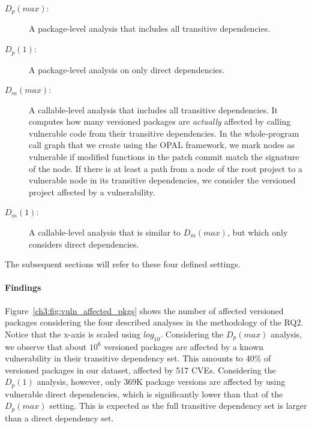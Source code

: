 \begin{description}
%
\item[$D_p(max)$:]  A package-level analysis that includes all transitive dependencies.
%
\item[$D_p(1)$:]
A package-level analysis on only direct dependencies.
%
\item[$D_m(max)$:]
A callable-level analysis that includes all transitive dependencies.
It computes how many versioned packages are \textit{actually} affected by calling vulnerable code from their transitive dependencies.
In the whole-program call graph that we create using the OPAL framework, we mark nodes as vulnerable if modified functions in the patch commit match the signature of the node.
If there is at least a path from a node of the root project to a vulnerable node in its transitive dependencies, we consider the versioned project affected by a vulnerability.
%
\item[$D_m(1)$:]
A callable-level analysis that is similar to $D_m(max)$, but which only considers direct dependencies.
%
\end{description}

The subsequent sections will refer to these four defined settings.

\paragraph{Findings}
Figure~\ref{ch3:fig:vuln_affected_pkgs} shows the number of affected versioned packages considering the four described analyses in the methodology of the RQ2. Notice that the x-axis is scaled using $log_{10}$. Considering the $D_p(max)$ analysis, we observe that about $10^{6}$ versioned packages are affected by a known vulnerability in their transitive dependency set. This amounts to 40\% of versioned packages in our dataset, affected by 517 CVEs. Considering the $D_p(1)$ analysis, however, only 369K package versions are affected by using vulnerable direct dependencies, which is significantly lower than that of the $D_p(max)$ setting. This is expected as the full transitive dependency set is larger than a direct dependency set.

